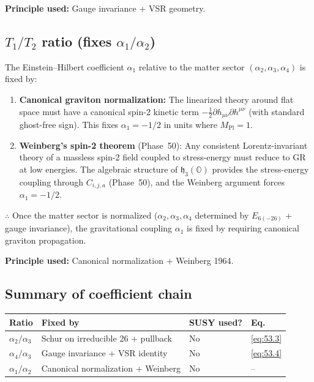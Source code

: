 \textbf{Principle used:} Gauge invariance + VSR geometry.

\subsection{$T_1/T_2$ ratio (fixes $\alpha_1/\alpha_2$)}

The Einstein--Hilbert coefficient $\alpha_1$ relative to the matter sector
$(\alpha_2, \alpha_3, \alpha_4)$ is fixed by:
\begin{enumerate}
  \item \textbf{Canonical graviton normalization:} The linearized theory
    around flat space must have a canonical spin-2 kinetic term
    $-\tfrac{1}{2}\partial h_{\mu\nu}\partial h^{\mu\nu}$ (with standard
    ghost-free sign). This fixes $\alpha_1 = -1/2$ in units where
    $M_{\mathrm{Pl}} = 1$.
  \item \textbf{Weinberg's spin-2 theorem} (Phase~50): Any consistent
    Lorentz-invariant theory of a massless spin-2 field coupled to
    stress-energy must reduce to GR at low energies. The algebraic
    structure of $\mathfrak{h}_3(\mathbb{O})$ provides the stress-energy
    coupling through $C_{i,j,a}$ (Phase~50), and the Weinberg argument
    forces $\alpha_1 = -1/2$.
\end{enumerate}

$\therefore$ Once the matter sector is normalized ($\alpha_2, \alpha_3, \alpha_4$
determined by $E_{6(-26)}$ + gauge invariance), the gravitational coupling
$\alpha_1$ is fixed by requiring canonical graviton propagation.

\textbf{Principle used:} Canonical normalization + Weinberg 1964.

\subsection{Summary of coefficient chain}

\begin{center}
\begin{tabular}{llll}
\hline
Ratio & Fixed by & SUSY used? & Eq. \\
\hline
$\alpha_2/\alpha_3$ & Schur on irreducible 26 + pullback & No & \ref{eq:53.3} \\
$\alpha_4/\alpha_3$ & Gauge invariance + VSR identity & No & \ref{eq:53.4} \\
$\alpha_1/\alpha_2$ & Canonical normalization + Weinberg & No & -- \\
\hline
\end{tabular}
\end{center}

